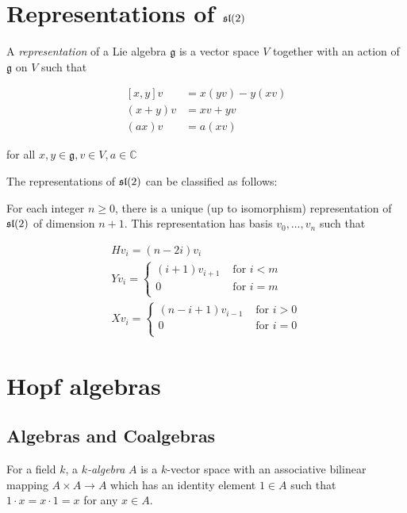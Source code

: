 \section{Representations of $\mathfrak{sl}(2)$}

A \emph{representation} of a Lie algebra $\mathfrak{g}$ is a vector space $V$
together with an action of $\mathfrak{g}$ on $V$ such that 

\begin{align*}
    \left[ x,y \right] v &= x(yv) - y(xv) \\
    (x+y)v &= xv + yv \\
    (ax)v &= a(xv)
\end{align*}

for all $x,y \in \mathfrak{g}, v \in V, a \in \mathbb{C}$

The representations of $\mathfrak{sl}(2)$ can be classified as follows: 

For each integer $n \geq 0$, there is a unique (up to isomorphism)
representation of $\mathfrak{sl}(2)$ of dimension $n+1$. This representation has basis
$v_0, \ldots, v_{n}$ such that

\begin{align*}
    &H v_i = (n - 2i) v_i& \\
    &Y v_i = \begin{cases} 
                (i+1)v_{i+1}& \text{ for $i < m$} \\
                0& \text{ for $i = m$} \\
            \end{cases} \\
    &X v_i = \begin{cases} 
                (n-i+1)v_{i-1}& \text{ for $i > 0$} \\
                0& \text{ for $i = 0$} \\
            \end{cases}
\end{align*}



\section{Hopf algebras}
\subsection{Algebras and Coalgebras}
For a field $k$, a \emph{$k$-algebra} $A$ is a $k$-vector space with an
associative bilinear mapping $A \times A \to A$ which has an identity element
$1 \in A$ such that $1\cdot x = x\cdot 1 = x$ for any $x \in A$.

